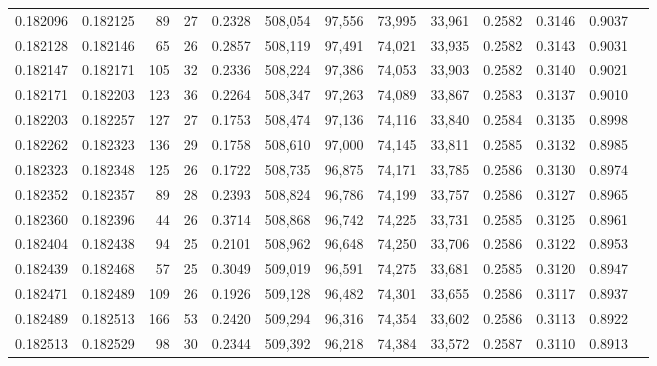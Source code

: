 \begin{tabular}{rrrrrrrrrrrrr}
0.182096 & 0.182125 &    89 &  27 &                                     0.2328 & 508,054 &  97,556 &  73,995 &  33,961 & 0.2582 & 0.3146 & 0.9037 \\
0.182128 & 0.182146 &    65 &  26 &                                     0.2857 & 508,119 &  97,491 &  74,021 &  33,935 & 0.2582 & 0.3143 & 0.9031 \\
0.182147 & 0.182171 &   105 &  32 &                                     0.2336 & 508,224 &  97,386 &  74,053 &  33,903 & 0.2582 & 0.3140 & 0.9021 \\
0.182171 & 0.182203 &   123 &  36 &                                     0.2264 & 508,347 &  97,263 &  74,089 &  33,867 & 0.2583 & 0.3137 & 0.9010 \\
0.182203 & 0.182257 &   127 &  27 &                                     0.1753 & 508,474 &  97,136 &  74,116 &  33,840 & 0.2584 & 0.3135 & 0.8998 \\
0.182262 & 0.182323 &   136 &  29 &                                     0.1758 & 508,610 &  97,000 &  74,145 &  33,811 & 0.2585 & 0.3132 & 0.8985 \\
0.182323 & 0.182348 &   125 &  26 &                                     0.1722 & 508,735 &  96,875 &  74,171 &  33,785 & 0.2586 & 0.3130 & 0.8974 \\
0.182352 & 0.182357 &    89 &  28 &                                     0.2393 & 508,824 &  96,786 &  74,199 &  33,757 & 0.2586 & 0.3127 & 0.8965 \\
0.182360 & 0.182396 &    44 &  26 &                                     0.3714 & 508,868 &  96,742 &  74,225 &  33,731 & 0.2585 & 0.3125 & 0.8961 \\
0.182404 & 0.182438 &    94 &  25 &                                     0.2101 & 508,962 &  96,648 &  74,250 &  33,706 & 0.2586 & 0.3122 & 0.8953 \\
0.182439 & 0.182468 &    57 &  25 &                                     0.3049 & 509,019 &  96,591 &  74,275 &  33,681 & 0.2585 & 0.3120 & 0.8947 \\
0.182471 & 0.182489 &   109 &  26 &                                     0.1926 & 509,128 &  96,482 &  74,301 &  33,655 & 0.2586 & 0.3117 & 0.8937 \\
0.182489 & 0.182513 &   166 &  53 &                                     0.2420 & 509,294 &  96,316 &  74,354 &  33,602 & 0.2586 & 0.3113 & 0.8922 \\
0.182513 & 0.182529 &    98 &  30 &                                     0.2344 & 509,392 &  96,218 &  74,384 &  33,572 & 0.2587 & 0.3110 & 0.8913 \\

\end{tabular}
